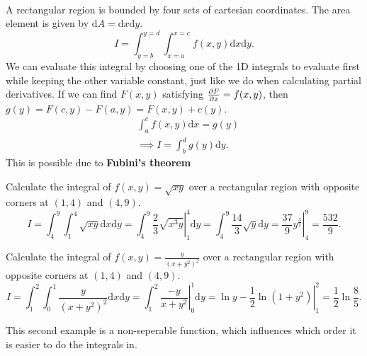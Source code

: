 \documentclass[../multivariate_calculus.tex]{subfiles}
\begin{document}
        \paragraph{}
        A rectangular region is bounded by four sets of cartesian coordinates.
        The area element is given by $\mathrm{d}A=\mathrm{d}x\mathrm{d}y$.
        \begin{equation}
            I=\int_{y=b}^{y=d}\int_{x=a}^{x=c}f(x,y)\mathrm{d}x\mathrm{d}y.
        \end{equation}
        We can evaluate this integral by choosing one of the 1D integrals to evaluate first while keeping the other variable constant, just like we do when calculating partial derivatives.
        If we can find $F(x,y)$ satisfying $\frac{\partial F}{\partial x}=f(x,y)$, then $g(y)=F(c,y)-F(a,y)=F(x,y)+c(y)$.
        \begin{align}
            &\int_a^c f(x,y)\mathrm{d}x=g(y)\\
            &\implies I=\int_b^d g(y)\mathrm{d}y.
        \end{align}
        This is possible due to \textbf{Fubini's theorem}
        \begin{example}
            Calculate the integral of $f(x,y)=\sqrt{xy}$ over a rectangular region with opposite corners at $(1,4)$ and $(4,9)$.
            \begin{equation}
                I=\int_4^9\int_1^4\sqrt{xy}\mathrm{d}x\mathrm{d}y=\int_4^9\left.\frac{2}{3}\sqrt{x^3y}\right|_1^4\mathrm{d}y=\int_4^9\frac{14}{3}\sqrt{y}\mathrm{d}y=\left.\frac{37}{9}y^{\frac{3}{2}}\right|_4^9=\frac{532}{9}.
            \end{equation}
        \end{example}
        \begin{example}
            Calculate the integral of $f(x,y)=\frac{y}{(x+y^2)^2}$ over a rectangular region with opposite corners at $(1,4)$ and $(4,9)$.
            \begin{equation}
                I=\int_1^2\int_0^1\frac{y}{(x+y^2)^2}\mathrm{d}x\mathrm{d}y=\int_1^2\left.\frac{-y}{x+y^2}\right|_0^1\mathrm{d}y=\left.\ln y-\frac{1}{2}\ln(1+y^2)\right|_1^2=\frac{1}{2}\ln\frac{8}{5}.
            \end{equation}
        \end{example}
        This second example is a non-seperable function, which influences which order it is easier to do the integrals in.
\end{document}
